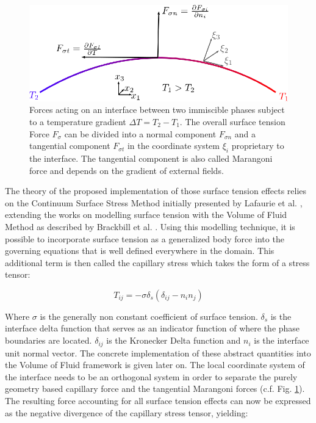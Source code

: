 \documentclass[conference,final,a4paper]{IEEEtran}
\begin{document}
\begin{figure}[!tbp]
  \centering
  \includegraphics[width=\linewidth]{Figs/surface-tension.eps}
  \caption{Forces acting on an interface between two immiscible phases subject to a temperature gradient $\Delta T = T_{2} - T_{1}$. The overall surface tension Force $F_{\sigma}$ can be divided into a normal component $F_{\sigma n}$ and a tangential component $F_{\sigma t}$ in the coordinate system $\xi_{i}$ proprietary to the interface. The tangential component is also called Marangoni force and depends on the gradient of external fields.}
  \label{fig:surface-tension}
\end{figure}

The theory of the proposed implementation of those surface tension effects relies on the Continuum Surface Stress Method initially presented by Lafaurie et al. \cite{lafaurieModellingMergingFragmentation1994}, extending the works on modelling surface tension with the Volume of Fluid Method as described by Brackbill et al. \cite{brackbillContinuumMethodModeling1992}. Using this modelling technique, it is possible to incorporate surface tension as a generalized body force into the governing equations that is well defined everywhere in the domain. This additional term is then called the capillary stress which takes the form of a stress tensor:

\begin{equation}
    T_{ij} = - \sigma \delta_s (\delta_{ij} - n_i n_j)
\end{equation}

Where $\sigma$ is the generally non constant coefficient of surface tension. $\delta_s$ is the interface delta function that serves as an indicator function of where the phase boundaries are located. $\delta_{ij}$ is the Kronecker Delta function and $n_i$ is the interface unit normal vector. The concrete implementation of these abstract quantities into the Volume of Fluid framework is given later on. The local coordinate system of the interface needs to be an orthogonal system in order to separate the purely geometry based capillary force and the tangential Marangoni forces (c.f. Fig. \ref{fig:surface-tension}).
The resulting force accounting for all surface tension effects can now be expressed as the negative divergence of the capillary stress tensor, yielding:
\end{document}
